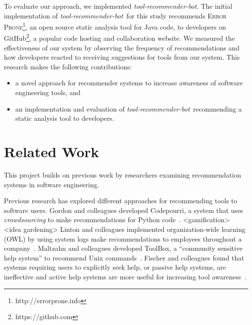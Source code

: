 \documentclass[sigconf,review,anonymous]{acmart}
\newcommand{\tool}{\textsl{tool-recommender-bot}}
\begin{document}

To evaluate our approach, we implemented \tool. The initial implementation of \tool~for this study recommends \textsc{Error Prone}\footnote{http://errorprone.info}, an open source static analysis tool for Java code, to developers on GitHub\footnote{https://github.com}, a popular code hosting and collaboration website. We measured the effectiveness of our system by observing the frequency of recommendations and how developers reacted to receiving suggestions for tools from our system. This research makes the following contributions:

\begin{itemize}
 \item a novel approach for recommender systems to increase awareness of software engineering tools, and
 \item an implementation and evaluation of \tool~recommending a static analysis tool to developers.
 \end{itemize}

\section{Related Work}
This project builds on previous work by researchers examining recommendation systems in software engineering.

Previous research has explored different approaches for recommending tools to software users. Gordon and colleagues developed Codepourri, a system that uses \textit{crowdsourcing} to make recommendations for Python code~\cite{Gordon2015Codepourri}. <gamification> <idea gardening> Linton and colleagues implemented organization-wide learning (OWL) by using system logs make recommendations to employees throughout a company~\cite{Linton2000OWL}. Maltzahn and colleagues developed ToolBox, a ``community sensitive help system'' to recommend Unix commands~\cite{Maltzahn1995Toolbox}. Fischer and colleagues found that systems requiring users to explicitly seek help, or passive help systems, are ineffective and active help systems are more useful for increasing tool awareness~\cite{Fischer1984ActiveHelpSystems}.
\end{document}

